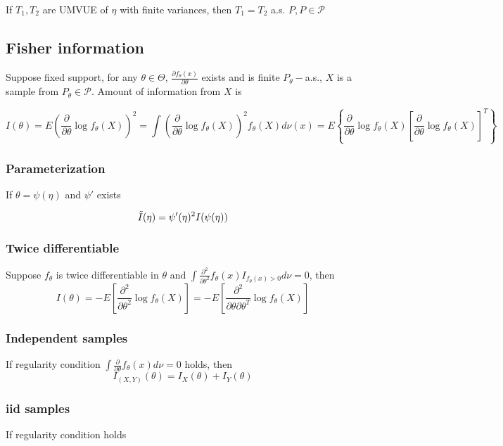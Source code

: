 If $T_1, T_2$ are UMVUE of $\eta$ with finite variances, then $T_1=T_2$ a.s. $P, P\in\mathcal{P}$

\subsection{Fisher information}
Suppose fixed support, for any $\theta\in\Theta$, $\frac{\partial f_\theta(x)}{\partial\theta}$ exists and is finite $P_\theta-$a.s., $X$ is a sample from $P_\theta\in\mathcal{P}$. Amount of information from $X$ is

$$
I(\theta) = E\left(
    \frac{\partial}{\partial\theta}\log f_\theta (X)
\right)^2 = \int \left(
    \frac{\partial}{\partial\theta} \log f_\theta(X)
\right)^2 f_\theta(X) d\nu(x)
    = E\left\{
        \frac{\partial}{\partial\theta}\log f_\theta(X) \left[
            \frac{\partial}{\partial\theta}\log f_\theta (X)
        \right]^T
    \right\}
$$

\subsubsection{Parameterization}

If $\theta=\psi(\eta)$ and $\psi'$ exists

$$
\Tilde{I}(\eta) = \psi'(\eta)^2 I(\psi(\eta))
$$

\subsubsection{Twice differentiable}

Suppose $f_\theta$ is twice differentiable in $\theta$ and $\int \frac{\partial^2}{\partial\theta^2}f_\theta(x)I_{f_\theta(x)>0}d\nu=0$, then 
$$
I(\theta) = -E\left[
    \frac{\partial^2}{\partial\theta^2} \log f_\theta(X)
\right] = - E \left[
        \frac{\partial^2}{\partial\theta\partial\theta^T} \log f_\theta(X)
    \right]
$$

\subsubsection{Independent samples}

If regularity condition $\int \frac{\partial}{\partial\theta}f_\theta(x)d\nu=0$ holds, then 
$$I_{(X, Y)}(\theta) = I_X(\theta) + I_Y(\theta)$$

\subsubsection{iid samples} If regularity condition holds

